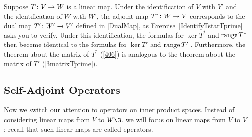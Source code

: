 Suppose $T \colon V \to W$ is a linear map. Under the identification of $V$ with $V'$ and the identification of $W$ with $W'\!$, the adjoint map $T^* \colon W \to V$ corresponds to the dual map $T' \colon W' \to V'$ defined in \ref{DualMap}, as Exercise~\ref{IdentifyTstarTprime} asks you to verify. Under this identification, the formulas for  $\ker T^*$ and $\operatorname{range} T^*$  then become identical to the formulas for $\ker T'$ and $\operatorname{range} T'$ . Furthermore, the theorem about the matrix of $T^*$ (\ref{406}) is analogous to the theorem about the matrix of $T'$ (\ref{3matrixTprime}).

\pagebreak[3]

\subsection{Self-Adjoint Operators}

Now we switch our attention to operators on inner product spaces. Instead of considering linear maps from $V$ to $W\3$, we will focus on linear maps from $V$ to $V$; recall that such linear maps are called operators.

